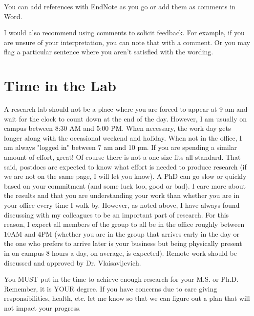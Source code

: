 \documentclass[letterpaper]{article}
\begin{document}
You can add references with EndNote as you go or add them as comments in Word. 

I would also recommend using comments to solicit feedback. For example, if you are unsure of your interpretation, you can note that with a comment. Or you may flag a particular sentence where you aren't satisfied with the wording.

\section*{Time in the Lab}
A research lab should not be a place where you are forced to appear at 9 am and wait for the clock to count down at the end of the day. However, I am usually on campus between 8:30 AM and 5:00 PM. When necessary, the work day gets longer along with the occasional weekend and holiday. When not in the office, I am always "logged in" between 7 am and 10 pm. If you are spending a similar amount of effort, great! Of course there is not a one-size-fits-all standard. That said, postdocs are expected to know what effort is needed to produce research (if we are not on the same page, I will let you know). A PhD can go slow or quickly based on your commitment (and some luck too, good or bad). I care more about the results and that you are understanding your work than whether you are in your office every time I walk by. However, as noted above, I have always found discussing with my colleagues to be an important part of research. For this reason, I expect all members of the group to all be in the office roughly between 10AM and 4PM (whether you are in the group that arrives early in the day or the one who prefers to arrive later is your business but being physically present in on campus 8 hours a day, on average, is expected). Remote work should be discussed and approved by Dr. Vlaisavljevich.

You MUST put in the time to achieve enough research for your M.S. or Ph.D. Remember, it is YOUR degree. If you have concerns due to care giving responsibilities, health, etc. let me know so that we can figure out a plan that will not impact your progress.
\end{document}
